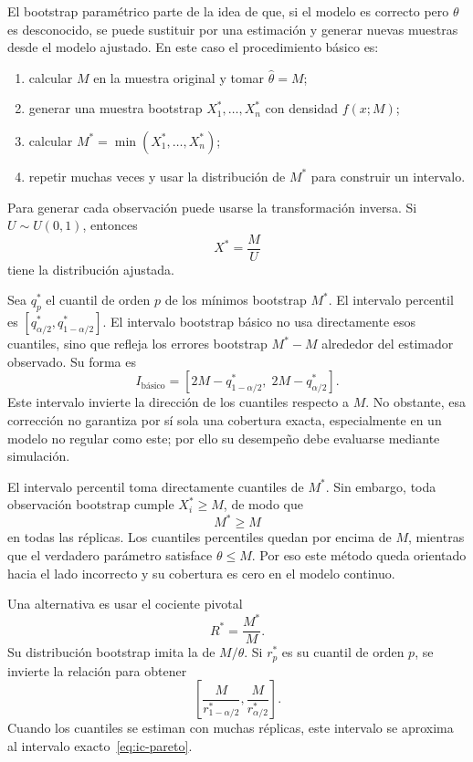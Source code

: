 \documentclass[10pt,a4paper,oneside]{article}
\begin{document}
El bootstrap paramétrico parte de la idea de que, si el modelo es correcto pero $\theta$ es desconocido, se puede sustituir por una estimación y generar nuevas muestras desde el modelo ajustado. En este caso el procedimiento básico es:
\begin{enumerate}
\item calcular $M$ en la muestra original y tomar $\widehat\theta=M$;
\item generar una muestra bootstrap $X_1^*,\ldots,X_n^*$ con densidad $f(x;M)$;
\item calcular $M^*=\min(X_1^*,\ldots,X_n^*)$;
\item repetir muchas veces y usar la distribución de $M^*$ para construir un intervalo.
\end{enumerate}
Para generar cada observación puede usarse la transformación inversa. Si $U\sim U(0,1)$, entonces
\begin{equation*}
X^*=\frac{M}{U}
\end{equation*}
tiene la distribución ajustada.

Sea $q_p^*$ el cuantil de orden $p$ de los mínimos bootstrap $M^*$. El intervalo percentil es $[q_{\alpha/2}^*,q_{1-\alpha/2}^*]$. El intervalo bootstrap básico no usa directamente esos cuantiles, sino que refleja los errores bootstrap $M^*-M$ alrededor del estimador observado. Su forma es
\begin{equation*}
\boxed{
I_{\text{básico}}=
\left[2M-q_{1-\alpha/2}^*,\;2M-q_{\alpha/2}^*\right].}
\end{equation*}
Este intervalo invierte la dirección de los cuantiles respecto a $M$. No obstante, esa corrección no garantiza por sí sola una cobertura exacta, especialmente en un modelo no regular como este; por ello su desempeño debe evaluarse mediante simulación.

El intervalo percentil toma directamente cuantiles de $M^*$. Sin embargo, toda observación bootstrap cumple $X_i^*\geq M$, de modo que
\begin{equation*}
M^*\geq M
\end{equation*}
en todas las réplicas. Los cuantiles percentiles quedan por encima de $M$, mientras que el verdadero parámetro satisface $\theta\leq M$. Por eso este método queda orientado hacia el lado incorrecto y su cobertura es cero en el modelo continuo.

Una alternativa es usar el cociente pivotal
\begin{equation*}
R^*=\frac{M^*}{M}.
\end{equation*}
Su distribución bootstrap imita la de $M/\theta$. Si $r_p^*$ es su cuantil de orden $p$, se invierte la relación para obtener
\begin{equation*}
\boxed{
\left[
\frac{M}{r_{1-\alpha/2}^*},
\frac{M}{r_{\alpha/2}^*}
\right].}
\end{equation*}
Cuando los cuantiles se estiman con muchas réplicas, este intervalo se aproxima al intervalo exacto~\eqref{eq:ic-pareto}.
\end{document}
